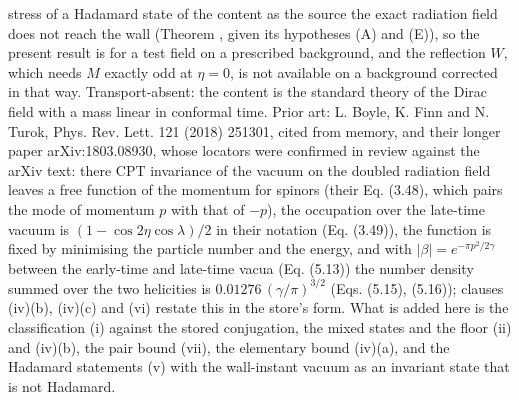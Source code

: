 stress of a Hadamard state of the content as the source the exact radiation field does not reach the wall (Theorem , given its hypotheses (A) and (E)), so the present result is for a test field on a prescribed background, and the reflection $W$, which needs $M$ exactly odd at $\eta = 0$, is not available on a background corrected in that way. Transport-absent: the content is the standard theory of the Dirac field with a mass linear in conformal time. Prior art: L. Boyle, K. Finn and N. Turok, Phys. Rev. Lett. 121 (2018) 251301, cited from memory, and their longer paper arXiv:1803.08930, whose locators were confirmed in review against the arXiv text: there CPT invariance of the vacuum on the doubled radiation field leaves a free function of the momentum for spinors (their Eq. (3.48), which pairs the mode of momentum $p$ with that of $-p$), the occupation over the late-time vacuum is $(1 - \cos 2\eta\cos\lambda)/2$ in their notation (Eq. (3.49)), the function is fixed by minimising the particle number and the energy, and with $|\beta| = e^{-\pi p^{2}/2\gamma}$ between the early-time and late-time vacua (Eq. (5.13)) the number density summed over the two helicities is $0.01276\,(\gamma/\pi)^{3/2}$ (Eqs. (5.15), (5.16)); clauses (iv)(b), (iv)(c) and (vi) restate this in the store's form. What is added here is the classification (i) against the stored conjugation, the mixed states and the floor (ii) and (iv)(b), the pair bound (vii), the elementary bound (iv)(a), and the Hadamard statements (v) with the wall-instant vacuum as an invariant state that is not Hadamard.
